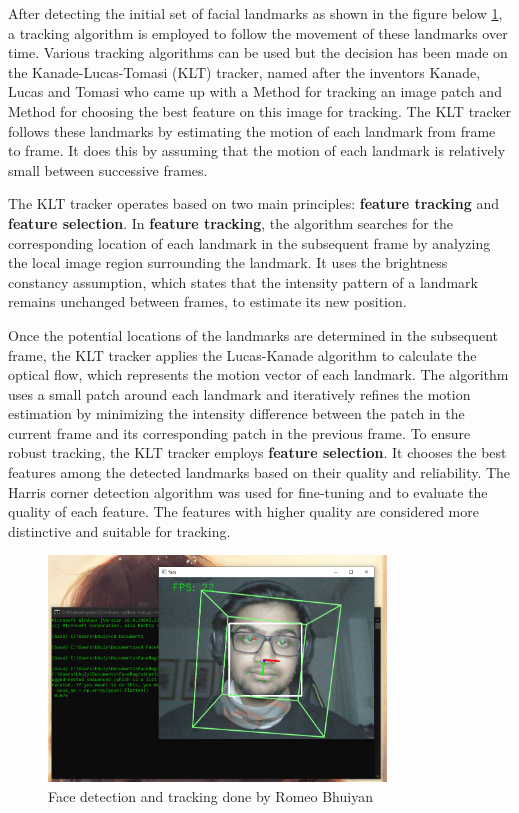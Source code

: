 After detecting the initial set of facial landmarks as shown in the figure below \ref{fig:facetracking}, 
a tracking algorithm is employed to follow the movement of these landmarks over time.
Various tracking algorithms can be used but the decision has been made on the Kanade-Lucas-Tomasi (KLT) tracker, named after
the inventors Kanade, Lucas and Tomasi who came up with a Method for tracking an image patch and Method for choosing the
best feature on this image for tracking. The KLT tracker follows these landmarks by estimating the motion of each 
landmark from frame to frame. It does this by assuming that the motion of each landmark is relatively small between 
successive frames.

The KLT tracker operates based on two main principles: \textbf{feature tracking} and \textbf{feature selection}. 
In \textbf{feature tracking}, the algorithm searches for the corresponding location of each landmark in the 
subsequent frame by analyzing the local image region surrounding the landmark. It uses the brightness 
constancy assumption, which states that the intensity pattern of a landmark remains unchanged between frames, 
to estimate its new position.

Once the potential locations of the landmarks are determined in the subsequent frame, the KLT tracker applies 
the Lucas-Kanade algorithm to calculate the optical flow, which represents the motion vector of each landmark. 
The algorithm uses a small patch around each landmark and iteratively refines the motion estimation by minimizing 
the intensity difference between the patch in the current frame and its corresponding patch in the previous frame.
To ensure robust tracking, the KLT tracker employs \textbf{feature selection}. 
It chooses the best features among the detected landmarks based on their quality and reliability. 
The Harris corner detection algorithm was used for fine-tuning and to evaluate the quality of each feature. 
The features with higher quality are considered more distinctive and suitable for tracking.

\begin{figure}[htb]
    \centering
    \includegraphics[width=0.8\textwidth]{pics/bhuiyanfracetracking.png}
    \caption{Face detection and tracking done by Romeo Bhuiyan}
    \label{fig:facetracking}
\end{figure}

